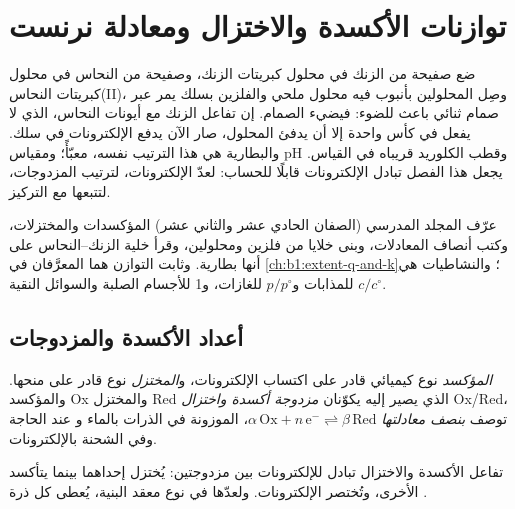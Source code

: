 \chapter{توازنات الأكسدة والاختزال ومعادلة نرنست}\label{ch:b1:nernst}

ضع صفيحة من الزنك في محلول كبريتات الزنك، وصفيحة من النحاس في
محلول كبريتات النحاس(II)، وصِل المحلولين بأنبوب فيه محلول
ملحي والفلزين بسلك يمر عبر صمام ثنائي باعث للضوء: فيضيء
الصمام. إن تفاعل الزنك مع أيونات النحاس، الذي لا يفعل في
كأس واحدة إلا أن يدفئ المحلول، صار الآن يدفع الإلكترونات في سلك. والبطارية
هي هذا الترتيب نفسه، معبّأً؛ ومقياس pH وقطب
الكلوريد قريباه في القياس. يجعل هذا الفصل تبادل الإلكترونات
قابلًا للحساب:  لعدّ الإلكترونات،
 لترتيب المزدوجات، 
لتتبعها مع التركيز.

\begin{recall}
عرّف المجلد المدرسي (الصفان الحادي عشر والثاني عشر) المؤكسدات والمختزلات،
وكتب أنصاف المعادلات، وبنى خلايا من فلزين ومحلولين،
وقرأ خلية الزنك--النحاس على أنها بطارية.  وثابت
التوازن هما المعرَّفان في \cref{ch:b1:extent-q-and-k}؛ والنشاطيات
هي $c/c^\circ$ للمذابات و$p/p^\circ$ للغازات، و1 للأجسام الصلبة
والسوائل النقية.
\end{recall}

\section{أعداد الأكسدة والمزدوجات}

\begin{definition}\label{def:b1:nernst:couple}
\emph{المؤكسد} نوع كيميائي قادر على اكتساب الإلكترونات،
و\emph{المختزل} نوع قادر على منحها. والمؤكسد
Ox والمختزل Red الذي يصير إليه يكوّنان \emph{مزدوجة أكسدة
واختزال} Ox/Red، توصف
\emph{بنصف معادلتها}
$\alpha\,\mathrm{Ox} + n\,\mathrm{e^-} \rightleftharpoons
\beta\,\mathrm{Red}$، الموزونة في الذرات بالماء  و عند
الحاجة وفي الشحنة بالإلكترونات.
\end{definition}

تفاعل الأكسدة والاختزال تبادل للإلكترونات بين مزدوجتين:
يُختزل  إحداهما بينما يتأكسد  الأخرى،
وتُختصر الإلكترونات. ولعدّها في نوع معقد البنية، يُعطى كل
ذرة .

